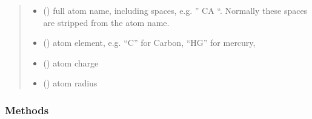 \documentclass[a4paper,10pt,english,openany,oneside]{sphinxmanual}
\begin{document}
\begin{fulllineitems}
\begin{fulllineitems}
\begin{quote}
\begin{description}
\begin{itemize}
\item {} 
\sphinxAtStartPar
{} () \textendash{} full atom name, including spaces, e.g. ” CA “. Normally
these spaces are stripped from the atom name.

\item {} 
\sphinxAtStartPar
{} (\sphinxstyleliteralemphasis{\sphinxupquote{)}}) \textendash{} atom element, e.g. “C” for Carbon, “HG” for mercury,

\item {} 
\sphinxAtStartPar
{} () \textendash{} atom charge

\item {} 
\sphinxAtStartPar
{} () \textendash{} atom radius

\end{itemize}

\end{description}\end{quote}
\subsubsection*{Methods}


\begin{savenotes}\sphinxatlongtablestart\begin{longtable}[c]{}
\hline

\endfirsthead

%
{}\\
\hline

\endhead

\hline
{}\\
\endfoot

\endlastfoot


\end{longtable}
\end{savenotes}
\end{fulllineitems}
\end{fulllineitems}
\end{document}
